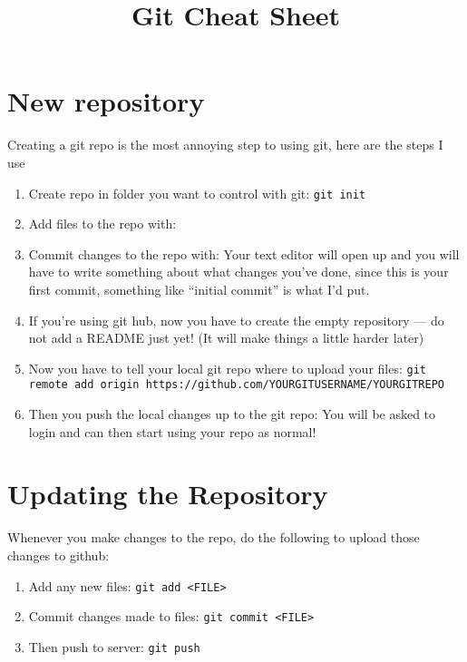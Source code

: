\documentclass{article}
\title{Git Cheat Sheet}
\date{ }
\begin{document}
\maketitle
\section*{New repository}

Creating a git repo is the most annoying step to using git, here are the steps I use

\begin{enumerate}
\item Create repo in folder you want to control with git:\newline
  \texttt{git init}
\item Add files to the repo with:\newline
\item Commit changes to the repo with:\newline
  \newline
  Your text editor will open up and you will have to write something about what changes you've done, since this is your first commit, something like ``initial commit'' is what I'd put.
\item If you're using git hub, now you have to create the empty repository --- do not add a README just yet! (It will make things a little harder later)
\item Now you have to tell your local git repo where to upload your files:\newline
  \texttt{git remote add origin https://github.com/YOURGITUSERNAME/YOURGITREPO}
\item Then you push the local changes up to the git repo:\newline
  \newline
  You will be asked to login and can then start using your repo as normal!
\end{enumerate}
  
\section*{Updating the Repository}
Whenever you make changes to the repo, do the following to upload those changes to github:
\begin{enumerate}
\item Add any new files:\newline
  \texttt{git add <FILE>}
\item Commit changes made to files:\newline
  \texttt{git commit <FILE>}
\item Then push to server:\newline
  \texttt{git push}
\end{enumerate}
\end{document}
